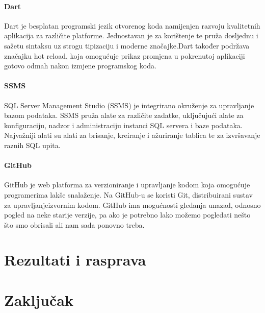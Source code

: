 \documentclass[diplomskirad]{fer}
\begin{document}
\subsubsection{Dart}
Dart je besplatan programski jezik otvorenog koda namijenjen razvoju kvalitetnih aplikacija za različite platforme. Jednostavan je za korištenje te pruža dosljednu i sažetu sintaksu uz strogu tipizaciju i moderne značajke.Dart također podržava značajku hot reload, koja omogućuje prikaz promjena u pokrenutoj aplikaciji gotovo odmah nakon izmjene programskog koda.
\cite{Dart}
\subsubsection{SSMS}
SQL Server Management Studio (SSMS) je integrirano okruženje za upravljanje bazom podataka. SSMS pruža alate za različite zadatke, uključujući alate za konfiguraciju, nadzor i administraciju instanci SQL servera i baze podataka. Najvažniji alati su alati za brisanje, kreiranje i ažuriranje tablica te za izvršavanje raznih SQL upita. \cite{SSMS}
\subsubsection{GitHub}
GitHub je web platforma za verzioniranje i upravljanje kodom koja omogućuje programerima lakše snalaženje. Na GitHub-u se koristi Git, distribuirani sustav za upravljanjeizvornim kodom. GitHub ima mogućnosti gledanja unazad, odnosno pogled na neke starije verzije, pa ako je potrebno lako možemo pogledati nešto što smo obrisali ali nam sada ponovno treba. \cite{GIT}

\label{pog:glavni_dio}


\chapter{Rezultati i rasprava}
\label{pog:rezultati_i_rasprava}




\chapter{Zaključak}
\label{pog:zakljucak}




\end{document}
